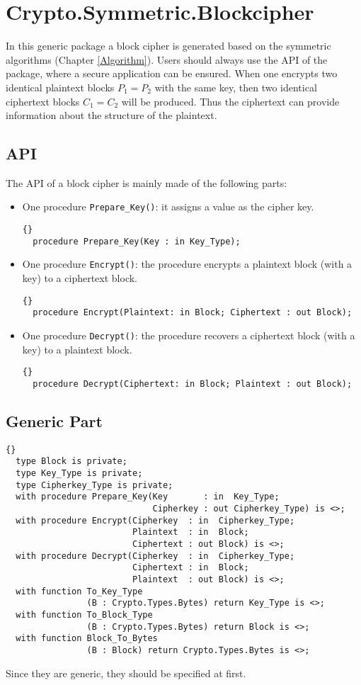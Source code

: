 \chapter{Crypto.Symmetric.Blockcipher}\label{Blockcipher}
In this generic package a block cipher is generated based on the
symmetric algorithms (Chapter \ref{Algorithm}). Users should always
use the API of the package, where a secure application can be ensured.
When one encrypts two identical plaintext blocks $P_1=P_2$ with the
same key, then two identical ciphertext blocks $C_1=C_2$ will be
produced. Thus the ciphertext can provide information about the
structure of the plaintext.
\section{API}
The API of a block cipher is mainly made of the following parts:
\begin{itemize}
\item One procedure \texttt{Prepare\_Key()}: it assigns a value as the
  cipher key.
\begin{lstlisting}{}
  procedure Prepare_Key(Key : in Key_Type);
\end{lstlisting}
\item One procedure \texttt{Encrypt()}: the procedure encrypts a
  plaintext block (with a key) to a ciphertext block.
\begin{lstlisting}{}
  procedure Encrypt(Plaintext: in Block; Ciphertext : out Block);
\end{lstlisting}
\item One procedure \texttt{Decrypt()}: the procedure recovers a
  ciphertext block (with a key) to a plaintext block.
\begin{lstlisting}{}
  procedure Decrypt(Ciphertext: in Block; Plaintext : out Block);
\end{lstlisting}
\end{itemize}

\section{Generic Part}
\begin{lstlisting}{}
  type Block is private;
  type Key_Type is private;
  type Cipherkey_Type is private;
  with procedure Prepare_Key(Key       : in  Key_Type;
                             Cipherkey : out Cipherkey_Type) is <>;
  with procedure Encrypt(Cipherkey  : in  Cipherkey_Type;
                         Plaintext  : in  Block;
                         Ciphertext : out Block) is <>;
  with procedure Decrypt(Cipherkey  : in  Cipherkey_Type;
                         Ciphertext : in  Block;
                         Plaintext  : out Block) is <>;
  with function To_Key_Type
                (B : Crypto.Types.Bytes) return Key_Type is <>;
  with function To_Block_Type
                (B : Crypto.Types.Bytes) return Block is <>;
  with function Block_To_Bytes
                (B : Block) return Crypto.Types.Bytes is <>;
\end{lstlisting}
Since they are generic, they should be specified at first.\\

